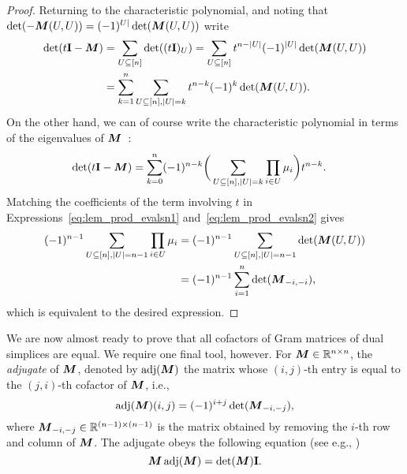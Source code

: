\begin{proof}
Returning to the characteristic polynomial, and noting that $\det(-{\vb*{M}}(U,U))=(-1)^{U|}\det({\vb*{M}}(U,U))$ write 
\begin{align}
\det(t\vb{I} - {\vb*{M}}) &= \sum_{U\subseteq[n]} \det((t\vb{I})_U) = \sum_{U\subseteq[n]}t^{n-|U|}(-1)^{|U|} \det({\vb*{M}}(U,U)) \notag \\
&=\sum_{k=1}^n \sum_{U\subseteq[n],|U|=k}t^{n-k}(-1)^k\det({\vb*{M}}(U,U)).\label{eq:lem_prod_evalsn1}
\end{align}
On the other  hand, we can of course  write the characteristic polynomial in  terms of  the  eigenvalues of ${\vb*{M}}$~\cite{brooks2006coefficients}: 
\begin{align}
\det(t\vb{I} -{\vb*{M}}) &= \sum_{k=0}^n (-1)^{n-k}\bigg(\sum_{U\subseteq[n],|U|=k}\prod_{i\in U}\mu_i\bigg)t^{n-k}.\label{eq:lem_prod_evalsn2}
\end{align}
Matching  the coefficients of the term involving  $t$  in  Expressions~\eqref{eq:lem_prod_evalsn1} and~\eqref{eq:lem_prod_evalsn2} gives 
\begin{align*}
(-1)^{n-1}\sum_{U\subseteq[n],|U|=n-1}\prod_{i\in U}\mu_i &= (-1)^{n-1}\sum_{U\subseteq[n],|U|=n-1}\det({\vb*{M}}(U,U)) \\
&= (-1)^{n-1}\sum_{i=1}^n\det({\vb*{M}}_{-i,-i}),
\end{align*}
which  is equivalent to the desired expression. 
\end{proof}


We are  now almost ready to prove  that all cofactors of Gram  matrices of dual simplices are equal. We require one final tool,  however.  
For ${\vb*{M}}\in\mathbb{R}^{n\times n}$,  the \emph{adjugate} of ${\vb*{M}}$, denoted by $\operatorname{\textnormal{adj}}({\vb*{M}})$ the matrix whose $(i,j)$-th entry is equal to the $(j,i)$-th  cofactor of ${\vb*{M}}$, i.e., 
\begin{equation*}
\operatorname{\textnormal{adj}}({\vb*{M}})(i,j) = (-1)^{i+j}\det({\vb*{M}}_{-i,-j}),
\end{equation*}
where ${\vb*{M}}_{-i,-j}\in\mathbb{R}^{(n-1)\times( n-1)}$ is the matrix obtained by removing the $i$-th row and column of ${\vb*{M}}$. The adjugate obeys  the following equation  (see e.g., \cite{godsil2013algebraic})
\begin{equation}
\label{eq:MadjM}
{\vb*{M}}\operatorname{\textnormal{adj}}({\vb*{M}})=\det({\vb*{M}})\vb{I}.
\end{equation}

